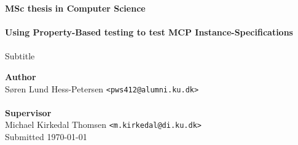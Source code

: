 \documentclass[a4paper,oneside]{memoir}
\begin{document}
    \thispagestyle{empty}
    \begin{adjustwidth}{-3cm}{-1.5cm}
    \vspace*{-1cm}
    \textbf{\Huge MSc thesis in Computer Science} \\
    \vspace*{2.5cm} \\
    \textbf{\Large Using Property-Based testing to test MCP Instance-Specifications} \\
    \vspace*{.1cm} \\
    {\huge Subtitle} \\
    \begin{tabbing}
    \textbf{\Large Author}\\
    Søren Lund Hess-Petersen \hspace{1cm} \= \texttt{<pws412@alumni.ku.dk>} \\
    \\[12cm]
    \textbf{\Large Supervisor} \\
    Michael Kirkedal Thomsen \> \texttt{<m.kirkedal@di.ku.dk>} \\[0.4cm]
    Submitted \today
    \end{tabbing}
    \end{adjustwidth}
    \newpage
    \ClearWallPaper
\end{document}

